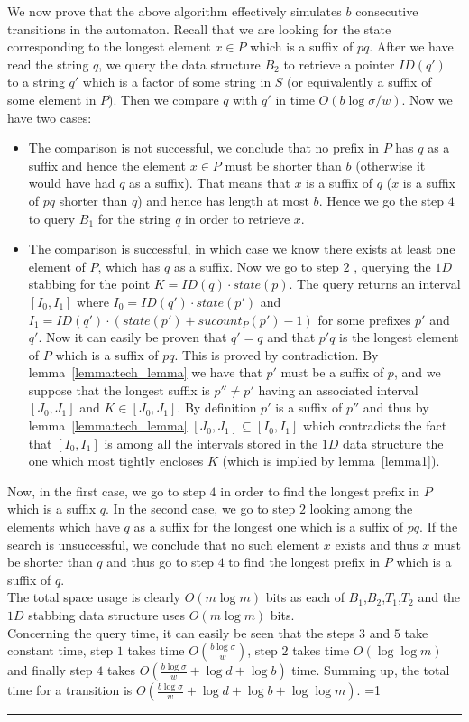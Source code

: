 \documentclass{article}
\newcommand{\?}{\mskip1.5mu}
\newcounter{noqed}
\newcommand{\qed}{ \ifmmode\mbox{
}\fi\rule[-.05em]{.3em}{.7em}\setcounter{noqed}{0}}
\newenvironment{proof}[1][{}]{\noindent{\bf Proof#1.
}\setcounter{noqed}{1}}{\ifnum\value{noqed}=1\qed\fi\par\medskip}
\begin{document}
\begin{proof} 
We now prove that the above algorithm effectively simulates $b$ consecutive transitions in the automaton. Recall that we are looking for the state corresponding to the longest element $x\in P$ which is a suffix of $pq$. 
After we have read the string $q$, we query the data structure $B_2$ to retrieve a pointer $ID(q')$ to a string $q'$ which is a factor of some string in $S$ (or equivalently a suffix of some element in $P$). Then we compare $q$ with $q'$ in time $O(b\log\sigma/w)$. Now we have two cases: 
\begin{itemize}
\item The comparison is not successful, we conclude that no prefix in $P$ has $q$ as a suffix and hence the element $x\in P$ must be shorter than $b$ (otherwise it would have had $q$ as a suffix). That means that $x$ is a suffix of $q$ ($x$ is a suffix of $pq$ shorter than $q$) and hence has length at most $b$. Hence we go the step $4$ to query $B_1$ for the string $q$ in order to retrieve $x$.
\item The comparison is successful, in which case we know there exists at least one element of $P$, which has $q$ as a suffix. Now we go to step $2$ , querying the $1D$ stabbing for the point $K=ID(q)\cdot state(p)$. The query returns an interval $[I_0,I_1]$ where $I_0=ID(q')\cdot state(p')$ and $I_1=ID(q')\cdot (state(p')+sucount_P(p')-1)$ for some prefixes $p'$ and $q'$. Now it can easily be proven that $q'=q$ and that $p'q$ is the longest element of $P$ which is a suffix of $pq$. This is proved by contradiction. By lemma~\ref{lemma:tech_lemma} we have that $p'$ must be a suffix of $p$, and we suppose that the longest suffix is $p''\neq p'$ having an associated interval $[J_0,J_1]$ and $K\in [J_0,J_1]$. By definition $p'$ is a suffix of $p''$  and thus by lemma~\ref{lemma:tech_lemma} $[J_0,J_1]\subseteq [I_0,I_1]$ which contradicts the fact that $[I_0,I_1]$ is among all the intervals stored in the $1D$ data structure the one which most tightly encloses $K$ (which is implied by lemma~\ref{lemma1}). 
\end{itemize}
Now, in the first case, we go to step $4$ in order to find the longest prefix in $P$ which is a suffix $q$. In the second case, we go to step $2$ looking among the elements which have $q$ as a suffix for the longest one which is a suffix of $pq$. If the search is unsuccessful, we conclude that no such element $x$ exists and thus $x$ must be shorter than $q$ and thus go to step $4$ to find the longest prefix in $P$ which is a suffix of $q$. 
\\
The total space usage is clearly $O(m\log m)$ bits as each of $B_1$,$B_2$,$T_1$,$T_2$ and the $1D$ stabbing data structure uses $O(m\log m)$ bits. 
\\
Concerning the query time, it can easily be seen that the steps $3$ and $5$ take constant time, step $1$ takes time $O(\frac{b\log\sigma}{w})$, step $2$ takes time $O(\log\log m)$ and finally step $4$ takes $O(\frac{b\log\sigma}{w}+\log d+\log b)$ time. Summing up, the total time for a transition is $O(\frac{b\log\sigma}{w}+\log d+\log b+\log\log m)$.
\end{proof}
\end{document}
